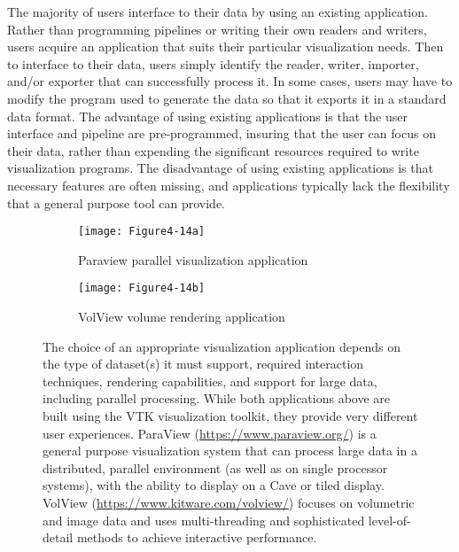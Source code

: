 The majority of users interface to their data by using an existing application. Rather than programming pipelines or writing their own readers and writers, users acquire an application that suits their particular visualization needs. Then to interface to their data, users simply identify the reader, writer, importer, and/or exporter that can successfully process it. In some cases, users may have to modify the program used to generate the data so that it exports it in a standard data format. The advantage of using existing applications is that the user interface and pipeline are pre-programmed, insuring that the user can focus on their data, rather than expending the significant resources required to write visualization programs. The disadvantage of using existing applications is that necessary features are often missing, and applications typically lack the flexibility that a general purpose tool can provide.

\begin{figure}[htb]
  \begin{subfigure}[h]{0.48\linewidth}
    \texttt{[image: Figure4-14a]}
    \caption{Paraview parallel visualization application}
    \label{fig:Figure4-14a}
  \end{subfigure}
  \hfill
  \begin{subfigure}[h]{0.48\linewidth}
    \texttt{[image: Figure4-14b]}
    \caption*{VolView volume rendering application}
    \label{fig:Figure4-14b}
  \end{subfigure}
  \caption{The choice of an appropriate visualization application depends on the type of dataset(s) it must support, required interaction techniques, rendering capabilities, and support for large data, including parallel processing. While both applications above are built using the VTK visualization toolkit, they provide very different user experiences. ParaView (\href{https://www.paraview.org/}{https://www.paraview.org/}) is a general purpose visualization system that can process large data in a distributed, parallel environment (as well as on single processor systems), with the ability to display on a Cave or tiled display. VolView (\href{https://www.kitware.com/volview/}{https://www.kitware.com/volview/}) focuses on volumetric and image data and uses multi-threading and sophisticated level-of-detail methods to achieve interactive performance.}\label{fig:Figure4-14}
\end{figure}

